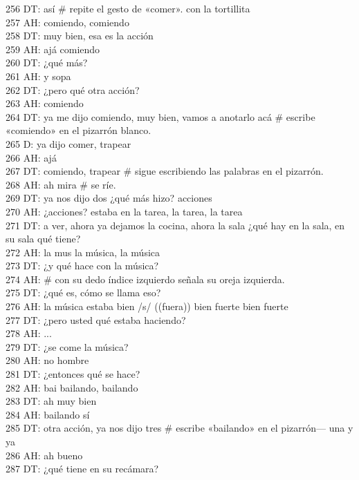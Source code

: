 256 DT: así \# repite el gesto de «comer». con la tortillita\\
257 AH: comiendo, comiendo\\
258 DT: muy bien, esa es la acción\\
259 AH: ajá comiendo\\
260 DT: ¿qué más?\\
261 AH: y sopa\\
262 DT: ¿pero qué otra acción?\\
263 AH: comiendo\\
264 DT: ya me dijo comiendo, muy bien, vamos a anotarlo acá \# escribe «comiendo» en el pizarrón blanco.\\
265 D: ya dijo comer, trapear\\
266 AH: ajá\\
267 DT: comiendo, trapear \# sigue escribiendo las palabras en el pizarrón.\\
268 AH: ah mira \# se ríe.\\
269 DT: ya nos dijo dos ¿qué más hizo? acciones\\
270 AH: ¿acciones? estaba en la tarea, la tarea, la tarea\\
271 DT: a ver, ahora ya dejamos la cocina, ahora la sala ¿qué hay en la sala, en su sala qué tiene?\\
272 AH: la mus la música, la música\\
273 DT: ¿y qué hace con la música?\\
274 AH: \# con su dedo índice izquierdo señala su oreja izquierda.\\
275 DT: ¿qué es, cómo se llama eso?\\
276 AH: la música estaba bien /s/ ((fuera)) bien fuerte bien fuerte\\
277 DT: ¿pero usted qué estaba haciendo?\\
278 AH: ...\\
279 DT: ¿se come la música?\\
280 AH: no hombre\\
281 DT: ¿entonces qué se hace?\\
282 AH: bai bailando, bailando\\
283 DT: ah muy bien\\
284 AH: bailando sí\\
285 DT: otra acción, ya nos dijo tres \# escribe «bailando» en el pizarrón--- una y ya\\
286 AH: ah bueno\\
287 DT: ¿qué tiene en su recámara?\\

